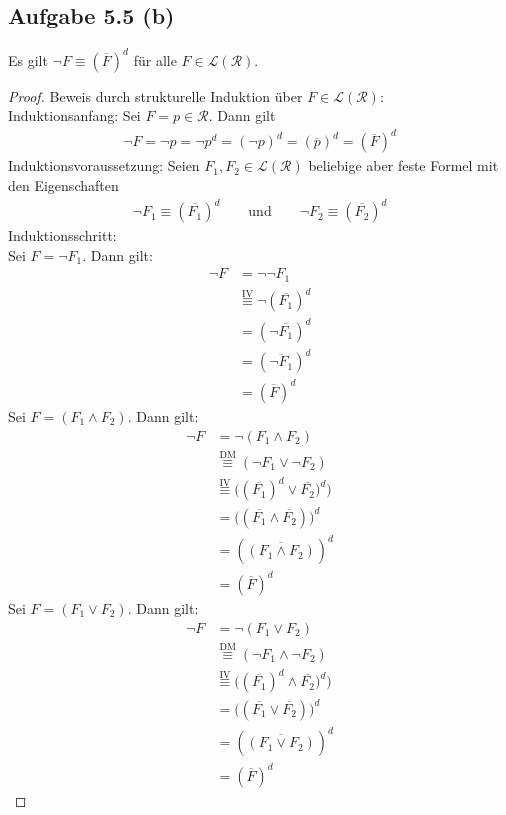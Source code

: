 \documentclass[12pt,a4paper]{article}
\newcommand{\RR}{\mathcal{R}}
\renewcommand{\L}{\mathcal{L}}
\begin{document}
\subsection*{Aufgabe 5.5 (b)}
Es gilt $\neg F\equiv(\overline{F})^d$ für alle $F\in\L(\RR)$.
\begin{proof}
Beweis durch strukturelle Induktion über $F\in\L(\RR)$:\\
Induktionsanfang: Sei $F=p\in\RR$. Dann gilt
\begin{align*}
\neg F=\neg p=\neg p^d=(\neg p)^d=(\overline{p})^d=(\overline{F})^d
\end{align*}
Induktionsvoraussetzung: Seien $F_1,F_2\in\L(\RR)$ beliebige aber feste Formel mit den Eigenschaften
\begin{align*}
\neg F_1\equiv (\overline{F_1})^d
\qquad\text{und}\qquad
\neg F_2\equiv (\overline{F_2})^d
\end{align*}
Induktionsschritt:\\
Sei $F=\neg F_1$. Dann gilt:
\begin{align*}
\neg F
&=\neg\neg F_1\\
&\stackrel{\text{IV}}{\equiv}
\neg(\overline{F_1})^d\\
&=(\neg\overline{F_1})^d\\
&=(\overline{\neg F_1})^d\\
&=(\overline{F})^d
\end{align*}
Sei $F=(F_1\wedge F_2)$. Dann gilt:
\begin{align*}
\neg F
&=\neg(F_1\wedge F_2)\\
&\stackrel{\text{DM}}{\equiv}
(\neg F_1\vee\neg F_2)\\
&\stackrel{\text{IV}}{\equiv}
\big((\overline{F_1})^d\vee\overline{F_2})^d\big)\\
&=\big((\overline{F_1}\wedge\overline{F_2})\big)^d\\
&=(\overline{(F_1\wedge F_2)})^d\\
&=(\overline{F})^d
\end{align*}
Sei $F=(F_1\vee F_2)$. Dann gilt:
\begin{align*}
\neg F
&=\neg(F_1\vee F_2)\\
&\stackrel{\text{DM}}{\equiv}
(\neg F_1\wedge\neg F_2)\\
&\stackrel{\text{IV}}{\equiv}
\big((\overline{F_1})^d\wedge\overline{F_2})^d\big)\\
&=\big((\overline{F_1}\vee\overline{F_2})\big)^d\\
&=(\overline{(F_1\vee F_2)})^d\\
&=(\overline{F})^d
\end{align*}
\end{proof}
\end{document}
